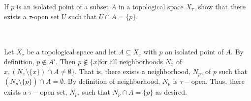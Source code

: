 If $p$ is an isolated point of a subset $A$ in a topological space $X_{\tau}$, show that there exists a
$\tau$-open set $U$ such that $U\cap A = \{p\}$.\\\\

\begin{solution}\renewcommand{\qedsymbol}{}\ \\
    Let $X_{\tau}$ be a topological space and let $A\subseteq X_{\tau}$ with $p$ an isolated point of
    $A$. By definition, $p\notin A'$. Then $p\notin\{x|$for all neighborhoods $N_x$ of
    $x, (N_x\setminus\{x\})\cap A\neq\emptyset\}$. That is, there exists a neighborhood, $N_p$, of $p$
    such that $(N_p\setminus\{p\})\cap A=\emptyset$. By definition of neighborhood,
    $N_p$ is $\tau-$open. Thus, there exists a $\tau-$open set, $N_p$, such that $N_p\cap A=\{p\}$
    as desired.

\end{solution}
